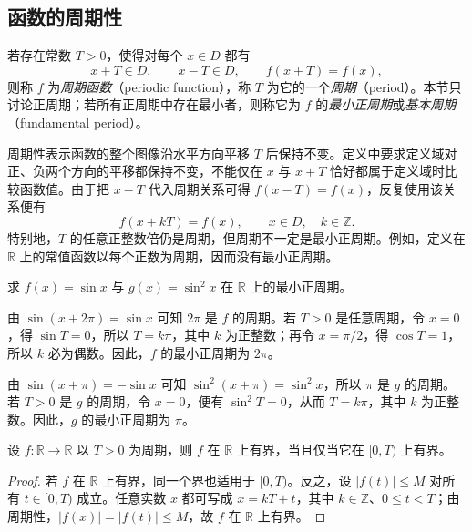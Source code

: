 \subsection{函数的周期性}
\label{subsec:periodicity-of-functions}

\begin{definition}
\label{def:periodic-functions}
若存在常数 $T>0$，使得对每个 $x\in D$ 都有
\[
    x+T\in D,\qquad x-T\in D,\qquad f(x+T)=f(x),
\]
则称 $f$ 为\emph{周期函数}（periodic function），称 $T$ 为它的一个\emph{周期}（period）。本节只讨论正周期；若所有正周期中存在最小者，则称它为 $f$ 的\emph{最小正周期}或\emph{基本周期}（fundamental period）。
\end{definition}

周期性表示函数的整个图像沿水平方向平移 $T$ 后保持不变。定义中要求定义域对正、负两个方向的平移都保持不变，不能仅在 $x$ 与 $x+T$ 恰好都属于定义域时比较函数值。由于把 $x-T$ 代入周期关系可得 $f(x-T)=f(x)$，反复使用该关系便有
\[
    f(x+kT)=f(x),\qquad x\in D,\quad k\in\mathbb{Z}.
\]
特别地，$T$ 的任意正整数倍仍是周期，但周期不一定是最小正周期。例如，定义在 $\mathbb{R}$ 上的常值函数以每个正数为周期，因而没有最小正周期。

\begin{example}
\label{ex:periods-of-sine-functions}
求 $f(x)=\sin x$ 与 $g(x)=\sin^2 x$ 在 $\mathbb{R}$ 上的最小正周期。
\end{example}

\begin{solve}
由 $\sin(x+2\pi)=\sin x$ 可知 $2\pi$ 是 $f$ 的周期。若 $T>0$ 是任意周期，令 $x=0$，得 $\sin T=0$，所以 $T=k\pi$，其中 $k$ 为正整数；再令 $x=\pi/2$，得 $\cos T=1$，所以 $k$ 必为偶数。因此，$f$ 的最小正周期为 $2\pi$。

由 $\sin(x+\pi)=-\sin x$ 可知 $\sin^2(x+\pi)=\sin^2 x$，所以 $\pi$ 是 $g$ 的周期。若 $T>0$ 是 $g$ 的周期，令 $x=0$，便有 $\sin^2 T=0$，从而 $T=k\pi$，其中 $k$ 为正整数。因此，$g$ 的最小正周期为 $\pi$。
\end{solve}

\begin{proposition}
\label{prop:periodic-function-boundedness}
设 $f:\mathbb{R}\to\mathbb{R}$ 以 $T>0$ 为周期，则 $f$ 在 $\mathbb{R}$ 上有界，当且仅当它在 $[0,T)$ 上有界。
\end{proposition}

\begin{proof}
若 $f$ 在 $\mathbb{R}$ 上有界，同一个界也适用于 $[0,T)$。反之，设 $|f(t)|\leq M$ 对所有 $t\in[0,T)$ 成立。任意实数 $x$ 都可写成 $x=kT+t$，其中 $k\in\mathbb{Z}$、$0\leq t<T$；由周期性，$|f(x)|=|f(t)|\leq M$，故 $f$ 在 $\mathbb{R}$ 上有界。
\end{proof}

